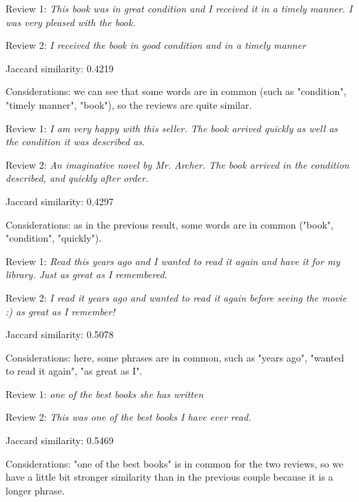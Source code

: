 \documentclass[12pt, a4paper]{article}
\begin{document}
\begin{itemize}
    {\fontsize{9pt}{11pt}\selectfont
    \item Review 1: \textit{This book was in great condition and I received it in a timely manner. I was very pleased with the book.}
    \item Review 2: \textit{I received the book in good condition and in a timely manner}
    \item Jaccard similarity: 0.4219
    \item Considerations: we can see that some words are in common (such as "condition", "timely manner", "book"), so the reviews are quite similar.
    } 
\end{itemize}
\dotfill
\begin{itemize}
    {\fontsize{9pt}{11pt}\selectfont
    \item Review 1: \textit{I am very happy with this seller. The book arrived quickly as well as the condition it was described as.}
    \item Review 2: \textit{An imaginative novel by Mr. Archer. The book arrived in the condition described, and quickly after order.}
    \item Jaccard similarity: 0.4297
    \item Considerations: as in the previous result, some words are in common ("book", "condition", "quickly").
    }
\end{itemize}
\dotfill
\begin{itemize}
    {\fontsize{9pt}{11pt}\selectfont
    \item Review 1: \textit{Read this years ago and I wanted to read it again and have it for my library. Just as great as I remembered.}
    \item Review 2: \textit{I read it years ago and wanted to read it again before seeing the movie :) as great as I remember!}
    \item Jaccard similarity: 0.5078
    \item Considerations: here, some phrases are in common, such as "years ago", "wanted to read it again", "as great as I". 
    }
\end{itemize}
\dotfill
\begin{itemize}
    {\fontsize{9pt}{11pt}\selectfont
    \item Review 1: \textit{one of the best books she has written}
    \item Review 2: \textit{This was one of the best books I have ever read.}
    \item Jaccard similarity: 0.5469
    \item Considerations: "one of the best books" is in common for the two reviews, so we have a little bit stronger similarity than in the previous couple because it is a longer phrase. 
    }
\end{itemize}
\end{document}

